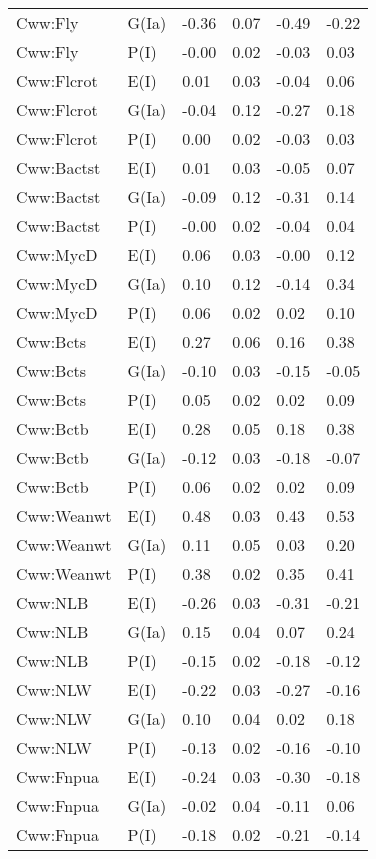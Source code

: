\begin{center}
\begin{longtable}{|p{1.1in}|p{0.7in}|p{0.7in}|p{0.6in}|p{0.6in}|p{0.6in}|}
  Cww:Fly & G(Ia) & -0.36 & 0.07 & -0.49 & -0.22 \\ 
  Cww:Fly & P(I) & -0.00 & 0.02 & -0.03 & 0.03 \\ 
  Cww:Flcrot & E(I) & 0.01 & 0.03 & -0.04 & 0.06 \\ 
  Cww:Flcrot & G(Ia) & -0.04 & 0.12 & -0.27 & 0.18 \\ 
  Cww:Flcrot & P(I) & 0.00 & 0.02 & -0.03 & 0.03 \\ 
  Cww:Bactst & E(I) & 0.01 & 0.03 & -0.05 & 0.07 \\ 
  Cww:Bactst & G(Ia) & -0.09 & 0.12 & -0.31 & 0.14 \\ 
  Cww:Bactst & P(I) & -0.00 & 0.02 & -0.04 & 0.04 \\ 
  Cww:MycD & E(I) & 0.06 & 0.03 & -0.00 & 0.12 \\ 
  Cww:MycD & G(Ia) & 0.10 & 0.12 & -0.14 & 0.34 \\ 
  Cww:MycD & P(I) & 0.06 & 0.02 & 0.02 & 0.10 \\ 
  Cww:Bcts & E(I) & 0.27 & 0.06 & 0.16 & 0.38 \\ 
  Cww:Bcts & G(Ia) & -0.10 & 0.03 & -0.15 & -0.05 \\ 
  Cww:Bcts & P(I) & 0.05 & 0.02 & 0.02 & 0.09 \\ 
  Cww:Bctb & E(I) & 0.28 & 0.05 & 0.18 & 0.38 \\ 
  Cww:Bctb & G(Ia) & -0.12 & 0.03 & -0.18 & -0.07 \\ 
  Cww:Bctb & P(I) & 0.06 & 0.02 & 0.02 & 0.09 \\ 
  Cww:Weanwt & E(I) & 0.48 & 0.03 & 0.43 & 0.53 \\ 
  Cww:Weanwt & G(Ia) & 0.11 & 0.05 & 0.03 & 0.20 \\ 
  Cww:Weanwt & P(I) & 0.38 & 0.02 & 0.35 & 0.41 \\ 
  Cww:NLB & E(I) & -0.26 & 0.03 & -0.31 & -0.21 \\ 
  Cww:NLB & G(Ia) & 0.15 & 0.04 & 0.07 & 0.24 \\ 
  Cww:NLB & P(I) & -0.15 & 0.02 & -0.18 & -0.12 \\ 
  Cww:NLW & E(I) & -0.22 & 0.03 & -0.27 & -0.16 \\ 
  Cww:NLW & G(Ia) & 0.10 & 0.04 & 0.02 & 0.18 \\ 
  Cww:NLW & P(I) & -0.13 & 0.02 & -0.16 & -0.10 \\ 
  Cww:Fnpua & E(I) & -0.24 & 0.03 & -0.30 & -0.18 \\ 
  Cww:Fnpua & G(Ia) & -0.02 & 0.04 & -0.11 & 0.06 \\ 
  Cww:Fnpua & P(I) & -0.18 & 0.02 & -0.21 & -0.14 \\ 

\end{longtable}
\end{center}
